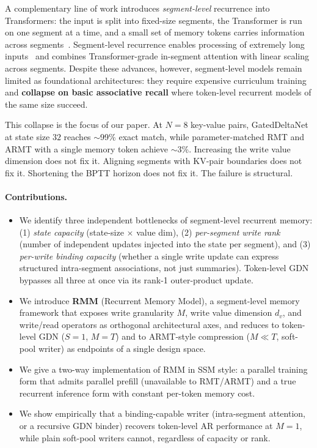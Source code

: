 \documentclass[11pt]{article}
\begin{document}
A complementary line of work introduces \emph{segment-level} recurrence into Transformers: the input is split into fixed-size segments, the Transformer is run on one segment at a time, and a small set of memory tokens carries information across segments~\citep{dai2019trxl, rae2019compressive, wu2020memformer, bulatov2022rmt, rodkin2024armt}. Segment-level recurrence enables processing of extremely long inputs~\citep{kuratov2024babilong} and combines Transformer-grade in-segment attention with linear scaling across segments. Despite these advances, however, segment-level models remain limited as foundational architectures: they require expensive curriculum training~\citep{kuzmin2026extending} and \textbf{collapse on basic associative recall} where token-level recurrent models of the same size succeed.

This collapse is the focus of our paper. At $N{=}8$ key-value pairs, GatedDeltaNet at state size $32$ reaches $\sim$99\% exact match, while parameter-matched RMT and ARMT with a single memory token achieve $\sim$3\%. Increasing the write value dimension does not fix it. Aligning segments with KV-pair boundaries does not fix it. Shortening the BPTT horizon does not fix it. The failure is structural.

\paragraph{Contributions.}
\begin{itemize}
    \item We identify three independent bottlenecks of segment-level recurrent memory: (1) \emph{state capacity} (state-size $\times$ value dim), (2) \emph{per-segment write rank} (number of independent updates injected into the state per segment), and (3) \emph{per-write binding capacity} (whether a single write update can express structured intra-segment associations, not just summaries). Token-level GDN bypasses all three at once via its rank-1 outer-product update.
    \item We introduce \textbf{RMM} (Recurrent Memory Model), a segment-level memory framework that exposes write granularity $M$, write value dimension $d_v$, and write/read operators as orthogonal architectural axes, and reduces to token-level GDN ($S{=}1$, $M{=}T$) and to ARMT-style compression ($M{\ll}T$, soft-pool writer) as endpoints of a single design space.
    \item We give a two-way implementation of RMM in SSM style: a parallel training form that admits parallel prefill (unavailable to RMT/ARMT) and a true recurrent inference form with constant per-token memory cost.
    \item We show empirically that a binding-capable writer (intra-segment attention, or a recursive GDN binder) recovers token-level AR performance at $M{=}1$, while plain soft-pool writers cannot, regardless of capacity or rank.
\end{itemize}
\end{document}
